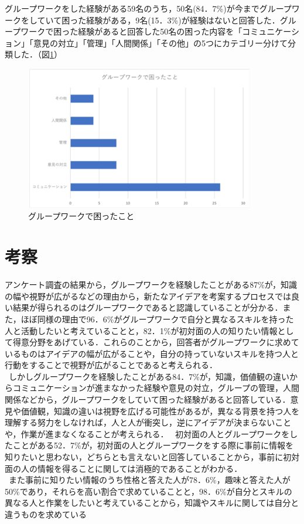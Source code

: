 \documentclass{funthesis}
\begin{document}
グループワークをした経験がある59名のうち，50名(84．7\%)が今までグループワークをしていて困った経験がある，9名(15．3\%)が経験はないと回答した．グループワークで困った経験があると回答した50名の困った内容を「コミュニケーション」「意見の対立」「管理」「人間関係」「その他」の5つにカテゴリー分けて分類した．（図\ref{graph4}）

\begin{figure}[h]
 \centering
   \includegraphics[width=100mm]{figures/graph4.png}
 \caption{グループワークで困ったこと}
 \label{graph4}
\end{figure}


\section{考察}

アンケート調査の結果から，グループワークを経験したことがある87\%が，知識の幅や視野が広がるなどの理由から，新たなアイデアを考案するプロセスでは良い結果が得られるのはグループワークであると認識していることが分かる．また，ほぼ同様の理由で96．6\%がグループワークで自分と異なるスキルを持った人と活動したいと考えていることと，82．1\%が初対面の人の知りたい情報として得意分野をあげている．これらのことから，回答者がグループワークに求めているものはアイデアの幅が広がることや，自分の持っていないスキルを持つ人と行動をすることで視野が広がることであると考えられる．\\
\ しかしグループワークを経験したことがある84．7\%が，知識，価値観の違いからコミュニケーションが進まなかった経験や意見の対立，グループの管理，人間関係などから，グループワークをしていて困った経験があると回答している．意見や価値観，知識の違いは視野を広げる可能性があるが，異なる背景を持つ人を理解する努力をしなければ，人と人が衝突し，逆にアイデアが決まらないことや，作業が進まなくなることが考えられる．
\ 初対面の人とグループワークをしたことがある52．7\%が，初対面の人とグループワークをする際に事前に情報を知りたいと思わない，どちらとも言えないと回答していることから，事前に初対面の人の情報を得ることに関しては消極的であることがわかる．\\
\ また事前に知りたい情報のうち性格と答えた人が78．6\%，趣味と答えた人が50\%であり，それらを高い割合で求めていることと，98．6\%が自分とスキルの異なる人と作業をしたいと考えていることから，知識やスキルに関しては自分と違うものを求めている
\end{document}
